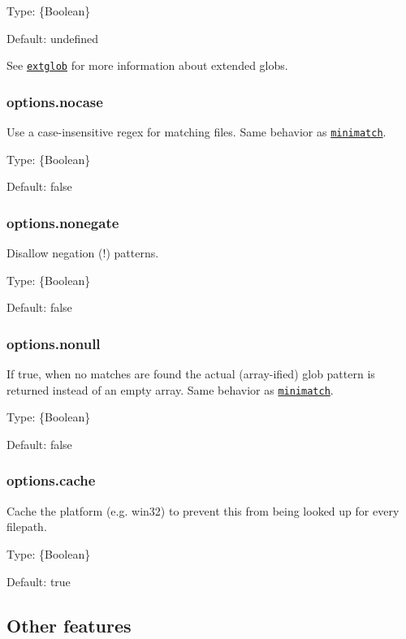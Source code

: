 Type\+: {\ttfamily \{Boolean\}}

Default\+: {\ttfamily undefined}

See \href{https://github.com/jonschlinkert/extglob}{\tt extglob} for more information about extended globs.

\subsubsection*{options.\+nocase}

Use a case-\/insensitive regex for matching files. Same behavior as \href{https://github.com/isaacs/minimatch}{\tt minimatch}.

Type\+: {\ttfamily \{Boolean\}}

Default\+: {\ttfamily false}

\subsubsection*{options.\+nonegate}

Disallow negation ({\ttfamily !}) patterns.

Type\+: {\ttfamily \{Boolean\}}

Default\+: {\ttfamily false}

\subsubsection*{options.\+nonull}

If {\ttfamily true}, when no matches are found the actual (array-\/ified) glob pattern is returned instead of an empty array. Same behavior as \href{https://github.com/isaacs/minimatch}{\tt minimatch}.

Type\+: {\ttfamily \{Boolean\}}

Default\+: {\ttfamily false}

\subsubsection*{options.\+cache}

Cache the platform (e.\+g. {\ttfamily win32}) to prevent this from being looked up for every filepath.

Type\+: {\ttfamily \{Boolean\}}

Default\+: {\ttfamily true}





\subsection*{Other features}

